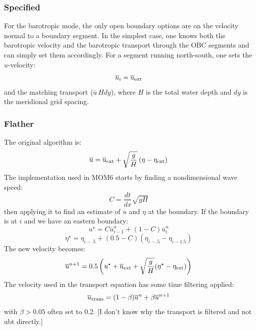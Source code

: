 \documentclass[11pt]{article}
\begin{document}
\subsubsection{Specified}
For the barotropic mode, the only open boundary options are on the
velocity normal to a boundary segment. In the simplest case, one
knows both the barotropic velocity and the barotropic transport
through the OBC segments and can simply set them accordingly.
For a segment running north-south, one sets the $u$-velocity:
\begin{equation}
  \overline{u}_{i} = \overline{u}_{\rm ext}
\end{equation}
and the matching transport ($\overline{u} \, H dy$),
where $H$ is the total water depth and $dy$ is the meridional grid
spacing.

\subsubsection{Flather}

The original \citet{Flather76} algorithm is:
\begin{equation}
  \overline{u} = \overline{u}_{\rm ext} + \sqrt{\frac{g}{H}} \,
    (\eta - \eta_{\rm ext})
\end{equation}
The implementation used in MOM6 starts by finding a nondimensional
wave speed:
\begin{equation}
  C = \frac{dt}{dx} \sqrt{gH}
\end{equation}
then applying it to find an estimate of $\overline{u}$ and $\eta$ at the boundary.
If the boundary is at $i$ and we have an eastern boundary:
\begin{equation}
  u^{\star} = C \overline{u}^n_{i-1} + (1-C)\overline{u}^n_i
\end{equation}
\begin{equation}
  \eta^{\star} = \eta_{i-.5} + (0.5-C)(\eta_{i-.5} - \eta_{i-1.5})
\end{equation}
The new velocity becomes:
\begin{equation}
  \overline{u}^{n+1} = 0.5 \left( u^{\star} + \overline{u}_{\rm ext} +
    \sqrt{\frac{g}{H}} (\eta^{\star} - \eta_{\rm ext}) \right)
\end{equation}
The velocity used in the transport equation has some time filtering applied:
\begin{equation}
  \overline{u}_{\rm trans} = (1 - \beta)\overline{u}^n + \beta \overline{u}^{n+1}
\end{equation}
with $\beta > 0.05$ often set to 0.2.
[I don't know why the transport is filtered and not ubt directly.]
\end{document}
